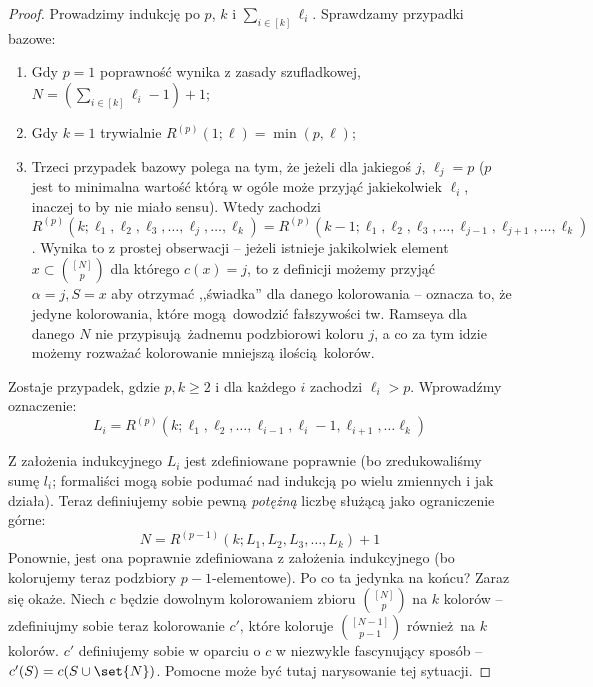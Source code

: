 \begin{proof}
	Prowadzimy indukcję po $p$, $k$ i $\sum_{i \in [k]} \ell_i$. Sprawdzamy przypadki bazowe:
	\begin{enumerate}
		\item Gdy $p = 1$ poprawność wynika z zasady szufladkowej, $N = (\sum_{i \in [k]} \ell_i - 1) + 1$;
		\item Gdy $k = 1$ trywialnie $R^{(p)}(1; \ell) = \min(p, \ell)$;
		\item Trzeci przypadek bazowy polega na tym, że jeżeli dla jakiegoś $j$, $\ell_j = p$ ($p$ jest to minimalna wartość którą w ogóle może przyjąć jakiekolwiek $\ell_i$, inaczej to by nie miało sensu).
		      Wtedy zachodzi $R^{(p)}(k; \ell_1,\ell_2,\ell_3,\ldots,\ell_j,\ldots,\ell_k) = R^{(p)}(k-1; \ell_1,\ell_2,\ell_3,\ldots,\ell_{j-1}, \ell_{j+1}, \ldots,\ell_k)$.
		      Wynika to z prostej obserwacji -- jeżeli istnieje jakikolwiek element $x \subset \binom{[N]}{p}$ dla którego $c(x) = j$, to
		      z definicji możemy przyjąć $\alpha = j, S = x$ aby otrzymać ,,świadka'' dla danego kolorowania --
		      oznacza to, że jedyne kolorowania, które mogą dowodzić fałszywości tw. Ramseya dla danego $N$ nie
		      przypisują żadnemu podzbiorowi koloru $j$, a co za tym idzie możemy rozważać kolorowanie mniejszą ilością kolorów.
	\end{enumerate}

	Zostaje przypadek, gdzie $p, k \geq 2$ i dla każdego $i$ zachodzi $\ell_i > p$. Wprowadźmy oznaczenie:
	\begin{equation*}
		L_i = R^{(p)}(k; \ell_1,\ell_2, \ldots, \ell_{i-1}, \ell_i - 1, \ell_{i+1}, \dots \ell_k)
	\end{equation*}

	Z założenia indukcyjnego $L_i$ jest zdefiniowane poprawnie (bo zredukowaliśmy sumę $l_i$; formaliści mogą sobie podumać nad indukcją po wielu zmiennych i jak działa).
	Teraz definiujemy sobie pewną \textit{potężną} liczbę służącą jako ograniczenie górne:
	\begin{equation*}
		N = R^{(p-1)}(k; L_1, L_2, L_3, \dots, L_k) + 1
	\end{equation*}
	Ponownie, jest ona poprawnie zdefiniowana z założenia indukcyjnego (bo kolorujemy teraz podzbiory $p-1$-elementowe). Po co ta jedynka na końcu? Zaraz się okaże.
	Niech $c$ będzie dowolnym kolorowaniem zbioru $\binom{[N]}{p}$ na $k$ kolorów -- zdefiniujmy sobie teraz kolorowanie $c'$, które koloruje $\binom{[N-1]}{p-1}$ również na $k$ kolorów.
	$c'$ definiujemy sobie w oparciu o $c$ w niezwykle fascynujący sposób -- $c'(S) = c(S \cup \set{N})$. Pomocne może być tutaj narysowanie tej sytuacji.


\end{proof}

